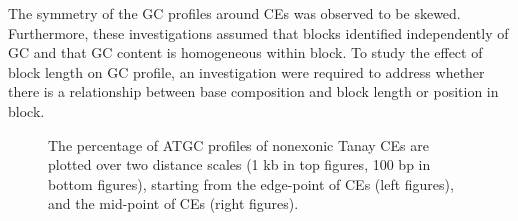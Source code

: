 \documentclass[12pt]{report}
\begin{document}
The symmetry of the GC profiles around CEs was observed to be skewed. Furthermore, these investigations assumed that blocks identified independently of GC and that GC content is homogeneous within block. To study the effect of block length on GC profile, an investigation were required to address whether there is a relationship between base composition and block length or position in block.\\

\begin{figure}[htbp]
\centering
{}
\caption{The percentage of ATGC profiles of nonexonic Tanay CEs are plotted over two distance scales (1 kb in top figures, 100 bp in bottom figures), starting from the edge-point of CEs (left figures), and the mid-point of CEs (right figures).}
\label{fig:ATGC_tan}
\end{figure}
\end{document}
